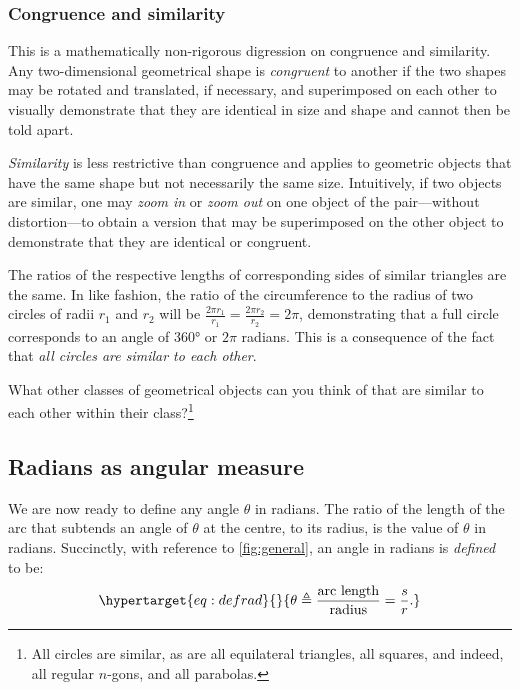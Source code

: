 \documentclass[
  a4paper,
]{article}
\begin{document}
\hypertarget{congruence-and-similarity}{%
\subsubsection{Congruence and
similarity}\label{congruence-and-similarity}}

This is a mathematically non-rigorous digression on congruence and
similarity. Any two-dimensional geometrical shape is \emph{congruent} to
another if the two shapes may be rotated and translated, if necessary,
and superimposed on each other to visually demonstrate that they are
identical in size and shape and cannot then be told apart.

\emph{Similarity} is less restrictive than congruence and applies to
geometric objects that have the same shape but not necessarily the same
size. Intuitively, if two objects are similar, one may \emph{zoom in} or
\emph{zoom out} on one object of the pair---without distortion---to
obtain a version that may be superimposed on the other object to
demonstrate that they are identical or congruent.

The ratios of the respective lengths of corresponding sides of similar
triangles are the same. In like fashion, the ratio of the circumference
to the radius of two circles of radii \(r_1\) and \(r_2\) will be
\(\frac{2\pi r_1}{r_1} =\frac{2\pi r_2}{r_2} = 2\pi\), demonstrating
that a full circle corresponds to an angle of 360° or \(2\pi\) radians.
This is a consequence of the fact that \emph{all circles are similar to
each other}.

What other classes of geometrical objects can you think of that are
similar to each other within their class?\footnote{All circles are
  similar, as are all equilateral triangles, all squares, and indeed,
  all regular \(n\)-gons, and all parabolas.}

\hypertarget{radians-as-angular-measure}{%
\subsection{Radians as angular
measure}\label{radians-as-angular-measure}}

We are now ready to define any angle \(\theta\) in radians. The ratio of
the length of the arc that subtends an angle of \(\theta\) at the
centre, to its radius, is the value of \(\theta\) in radians.
Succinctly, with reference to \cref{fig:general}, an angle in radians is
\emph{defined} to be: \begin{equation}\protect\hypertarget{eq:defrad}{}{
\theta \triangleq \frac{\text{arc length}}{\text{radius}} = \frac{s}{r}.
}\label{eq:defrad}\end{equation}
\end{document}
